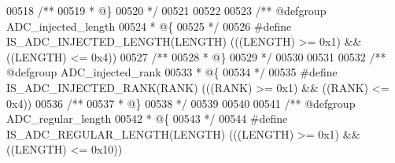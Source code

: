 \begin{DoxyCode}
00518 \textcolor{comment}{/**}
00519 \textcolor{comment}{  * @\}}
00520 \textcolor{comment}{  */}
00521 
00522 
00523 \textcolor{comment}{/** @defgroup ADC\_injected\_length }
00524 \textcolor{comment}{  * @\{}
00525 \textcolor{comment}{  */}
00526 \textcolor{preprocessor}{#}\textcolor{preprocessor}{define} \textcolor{preprocessor}{IS\_ADC\_INJECTED\_LENGTH}\textcolor{preprocessor}{(}\textcolor{preprocessor}{LENGTH}\textcolor{preprocessor}{)} \textcolor{preprocessor}{(}\textcolor{preprocessor}{(}\textcolor{preprocessor}{(}\textcolor{preprocessor}{LENGTH}\textcolor{preprocessor}{)} \textcolor{preprocessor}{>=} 0x1\textcolor{preprocessor}{)} \textcolor{preprocessor}{&&} \textcolor{preprocessor}{(}\textcolor{preprocessor}{(}\textcolor{preprocessor}{LENGTH}\textcolor{preprocessor}{)} \textcolor{preprocessor}{<=} 0x4\textcolor{preprocessor}{)}\textcolor{preprocessor}{)}
00527 \textcolor{comment}{/**}
00528 \textcolor{comment}{  * @\}}
00529 \textcolor{comment}{  */}
00530 
00531 
00532 \textcolor{comment}{/** @defgroup ADC\_injected\_rank }
00533 \textcolor{comment}{  * @\{}
00534 \textcolor{comment}{  */}
00535 \textcolor{preprocessor}{#}\textcolor{preprocessor}{define} \textcolor{preprocessor}{IS\_ADC\_INJECTED\_RANK}\textcolor{preprocessor}{(}\textcolor{preprocessor}{RANK}\textcolor{preprocessor}{)} \textcolor{preprocessor}{(}\textcolor{preprocessor}{(}\textcolor{preprocessor}{(}\textcolor{preprocessor}{RANK}\textcolor{preprocessor}{)} \textcolor{preprocessor}{>=} 0x1\textcolor{preprocessor}{)} \textcolor{preprocessor}{&&} \textcolor{preprocessor}{(}\textcolor{preprocessor}{(}\textcolor{preprocessor}{RANK}\textcolor{preprocessor}{)} \textcolor{preprocessor}{<=} 0x4\textcolor{preprocessor}{)}\textcolor{preprocessor}{)}
00536 \textcolor{comment}{/**}
00537 \textcolor{comment}{  * @\}}
00538 \textcolor{comment}{  */}
00539 
00540 
00541 \textcolor{comment}{/** @defgroup ADC\_regular\_length }
00542 \textcolor{comment}{  * @\{}
00543 \textcolor{comment}{  */}
00544 \textcolor{preprocessor}{#}\textcolor{preprocessor}{define} \textcolor{preprocessor}{IS\_ADC\_REGULAR\_LENGTH}\textcolor{preprocessor}{(}\textcolor{preprocessor}{LENGTH}\textcolor{preprocessor}{)} \textcolor{preprocessor}{(}\textcolor{preprocessor}{(}\textcolor{preprocessor}{(}\textcolor{preprocessor}{LENGTH}\textcolor{preprocessor}{)} \textcolor{preprocessor}{>=} 0x1\textcolor{preprocessor}{)} \textcolor{preprocessor}{&&} \textcolor{preprocessor}{(}\textcolor{preprocessor}{(}\textcolor{preprocessor}{LENGTH}\textcolor{preprocessor}{)} \textcolor{preprocessor}{<=} 0x10\textcolor{preprocessor}{)}\textcolor{preprocessor}{)}

\end{DoxyCode}
